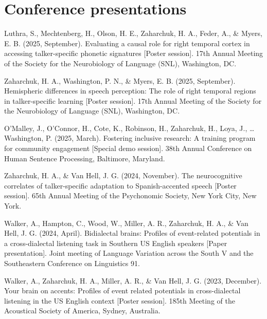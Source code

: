 \documentclass[11pt,a4paper,]{awesome-cv}
\newlength{\cslhangindent}
\newenvironment{CSLReferences}[2] %
 {\begin{list}{}{%
  \setlength{\itemindent}{0pt}
  \setlength{\leftmargin}{0pt}
  \setlength{\parsep}{0pt}
  \ifodd #1
   \setlength{\leftmargin}{\cslhangindent}
   \setlength{\itemindent}{-1\cslhangindent}
  \fi
  \setlength{\itemsep}{#2\baselineskip}}}
 {\end{list}}
\begin{document}
\section{Conference presentations}\label{conference-presentations}

\label{refs-b9cea82cda0234357d83c2877df6034e}
\begin{CSLReferences}{1}{0}
Luthra, S., Mechtenberg, H., Olson, H. E., Zaharchuk, H. A., Feder, A.,
\& Myers, E. B. (2025, September). Evaluating a causal role for right
temporal cortex in accessing talker-specific phonetic signatures
{[}Poster session{]}. 17th Annual Meeting of the Society for the
Neurobiology of Language (SNL), Washington, DC.

Zaharchuk, H. A., Washington, P. N., \& Myers, E. B. (2025, September).
Hemispheric differences in speech perception: The role of right temporal
regions in talker-specific learning {[}Poster session{]}. 17th Annual
Meeting of the Society for the Neurobiology of Language (SNL),
Washington, DC.

O'Malley, J., O'Connor, H., Cote, K., Robinson, H., Zaharchuk, H., Loya,
J., \ldots{} Washington, P. (2025, March). Fostering inclusive research:
A training program for community engagement {[}Special demo session{]}.
38th Annual Conference on Human Sentence Processing, Baltimore,
Maryland.

Zaharchuk, H. A., \& Van Hell, J. G. (2024, November). The
neurocognitive correlates of talker-specific adaptation to
Spanish-accented speech {[}Poster session{]}. 65th Annual Meeting of the
Psychonomic Society, New York City, New York.

Walker, A., Hampton, C., Wood, W., Miller, A. R., Zaharchuk, H. A., \&
Van Hell, J. G. (2024, April). Bidialectal brains: Profiles of
event-related potentials in a cross-dialectal listening task in Southern
US English speakers {[}Paper presentation{]}. Joint meeting of Language
Variation across the South V and the Southeastern Conference on
Linguistics 91.

Walker, A., Zaharchuk, H. A., Miller, A. R., \& Van Hell, J. G. (2023,
December). Your brain on accents: Profiles of event related potentials
in cross-dialectal listening in the US English context {[}Poster
session{]}. 185th Meeting of the Acoustical Society of America, Sydney,
Australia.


\end{CSLReferences}
\end{document}
